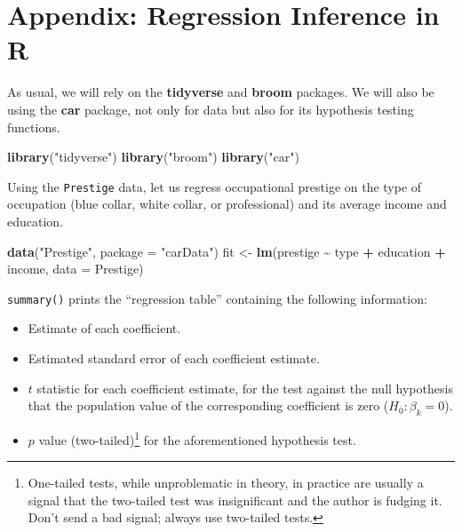 \documentclass[
  12pt,
  oneside,openany]{book}
\newenvironment{Shaded}{\begin{snugshade}}{\end{snugshade}}
\newcommand{\DataTypeTok}[1]{\textcolor[rgb]{0.13,0.29,0.53}{#1}}
\newcommand{\KeywordTok}[1]{\textcolor[rgb]{0.13,0.29,0.53}{\textbf{#1}}}
\newcommand{\NormalTok}[1]{#1}
\newcommand{\OperatorTok}[1]{\textcolor[rgb]{0.81,0.36,0.00}{\textbf{#1}}}
\newcommand{\StringTok}[1]{\textcolor[rgb]{0.31,0.60,0.02}{#1}}
\providecommand{\tightlist}{%
  \setlength{\itemsep}{0pt}\setlength{\parskip}{0pt}}
\begin{document}
\hypertarget{appendix-regression-inference-in-r}{%
\section{Appendix: Regression Inference in R}\label{appendix-regression-inference-in-r}}

As usual, we will rely on the \textbf{tidyverse} and \textbf{broom} packages. We will also be using the \textbf{car} package, not only for data but also for its hypothesis testing functions.

\begin{Shaded}
\begin{Highlighting}[]
\KeywordTok{library}\NormalTok{(}\StringTok{"tidyverse"}\NormalTok{)}
\KeywordTok{library}\NormalTok{(}\StringTok{"broom"}\NormalTok{)}
\KeywordTok{library}\NormalTok{(}\StringTok{"car"}\NormalTok{)}
\end{Highlighting}
\end{Shaded}

Using the \texttt{Prestige} data, let us regress occupational prestige on the type of occupation (blue collar, white collar, or professional) and its average income and education.

\begin{Shaded}
\begin{Highlighting}[]
\KeywordTok{data}\NormalTok{(}\StringTok{"Prestige"}\NormalTok{, }\DataTypeTok{package =} \StringTok{"carData"}\NormalTok{)}
\NormalTok{fit \textless{}{-}}\StringTok{ }\KeywordTok{lm}\NormalTok{(prestige }\OperatorTok{\textasciitilde{}}\StringTok{ }\NormalTok{type }\OperatorTok{+}\StringTok{ }\NormalTok{education }\OperatorTok{+}\StringTok{ }\NormalTok{income, }\DataTypeTok{data =}\NormalTok{ Prestige)}
\end{Highlighting}
\end{Shaded}

\texttt{summary()} prints the ``regression table'' containing the following information:

\begin{itemize}
\tightlist
\item
  Estimate of each coefficient.
\item
  Estimated standard error of each coefficient estimate.
\item
  \(t\) statistic for each coefficient estimate, for the test against the null hypothesis that the population value of the corresponding coefficient is zero (\(H_0 : \beta_k = 0\)).
\item
  \(p\) value (two-tailed)\footnote{One-tailed tests, while unproblematic in theory, in practice are usually a signal that the two-tailed test was insignificant and the author is fudging it. Don't send a bad signal; always use two-tailed tests.} for the aforementioned hypothesis test.
\end{itemize}
\end{document}
